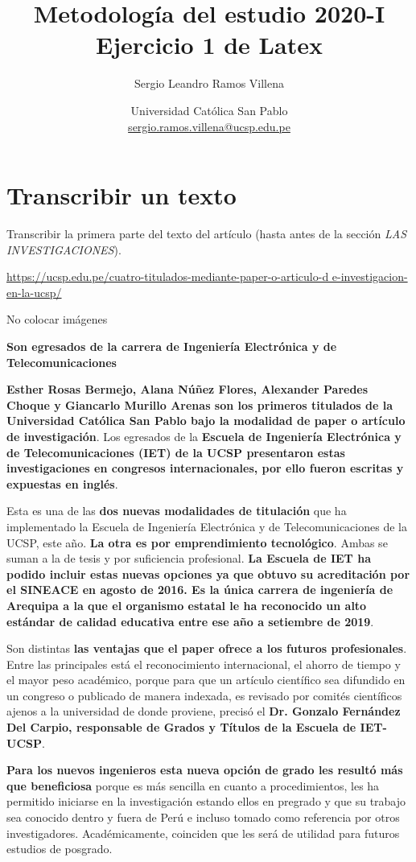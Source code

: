\documentclass{article}
\title{Metodología del estudio 2020-I \\ Ejercicio 1 de Latex}
\author{Sergio Leandro Ramos Villena}
\date{Universidad Católica San Pablo \\ \url{sergio.ramos.villena@ucsp.edu.pe} }
\begin{document}
\maketitle
\tableofcontents

\section{Transcribir un texto}
Transcribir la primera parte del texto del artículo (hasta antes de la sección
\textit{LAS INVESTIGACIONES}).

\url{https://ucsp.edu.pe/cuatro-titulados-mediante-paper-o-articulo-d
e-investigacion-en-la-ucsp/}

No colocar imágenes

	{\bf Son egresados de la carrera de Ingeniería Electrónica y de Telecomunicaciones}

{\bf Esther Rosas Bermejo, Alana Núñez Flores, Alexander Paredes Choque y Giancarlo Murillo Arenas son los primeros titulados de la Universidad Católica San Pablo bajo la modalidad de paper o artículo de investigación}. Los egresados de la {\bf Escuela de Ingeniería Electrónica y de Telecomunicaciones (IET) de la UCSP presentaron estas investigaciones en congresos internacionales, por ello fueron escritas y expuestas en inglés}.

Esta es una de las {\bf dos nuevas modalidades de titulación} que ha implementado la Escuela de Ingeniería Electrónica y de Telecomunicaciones de la UCSP, este año. {\bf La otra es por emprendimiento tecnológico}. Ambas se suman a la de tesis y por suficiencia profesional. {\bf La Escuela de IET ha podido incluir estas nuevas opciones ya que obtuvo su acreditación por el SINEACE en agosto de 2016. Es la única carrera de ingeniería de Arequipa a la que el organismo estatal le ha reconocido un alto estándar de calidad educativa entre ese año a setiembre de 2019}.

Son distintas {\bf las ventajas que el paper ofrece a los futuros profesionales}. Entre las principales está el reconocimiento internacional, el ahorro de tiempo y el mayor peso académico, porque para que un artículo científico sea difundido en un congreso o publicado de manera indexada, es revisado por comités científicos ajenos a la universidad de donde proviene, precisó el {\bf Dr. Gonzalo Fernández Del Carpio, responsable de Grados y Títulos de la Escuela de IET-UCSP}.

{\bf Para los nuevos ingenieros esta nueva opción de grado les resultó más que beneficiosa} porque es más sencilla en cuanto a procedimientos, les ha permitido iniciarse en la investigación estando ellos en pregrado y que su trabajo sea conocido dentro y fuera de Perú e incluso tomado como referencia por otros investigadores. Académicamente, coinciden que les será de utilidad para futuros estudios de posgrado.
\end{document}
